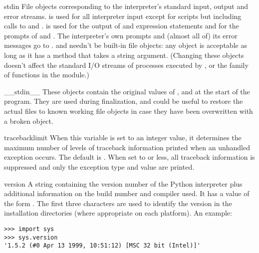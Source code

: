 \begin{datadesc}{stdin}
  File objects corresponding to the interpreter's standard input,
  output and error streams.   is used for all interpreter
  input except for scripts but including calls to
   and
  .   is
  used for the output of  and expression statements and
  for the prompts of  and .
  The interpreter's own prompts and (almost all of) its error messages
  go to .   and  needn't be
  built-in file objects: any object is acceptable as long as it has a
   method that takes a string argument.  (Changing
  these objects doesn't affect the standard I/O streams of processes
  executed by ,  or the
   family of functions in the 
  module.)
\end{datadesc}

\begin{datadesc}{__stdin__}
  These objects contain the original values of ,
   and  at the start of the program.  They
  are used during finalization, and could be useful to restore the
  actual files to known working file objects in case they have been
  overwritten with a broken object.
\end{datadesc}

\begin{datadesc}{tracebacklimit}
  When this variable is set to an integer value, it determines the
  maximum number of levels of traceback information printed when an
  unhandled exception occurs.  The default is .  When set
  to  or less, all traceback information is suppressed and
  only the exception type and value are printed.
\end{datadesc}

\begin{datadesc}{version}
  A string containing the version number of the Python interpreter
  plus additional information on the build number and compiler used.
  It has a value of the form .  The first three characters are used to identify
  the version in the installation directories (where appropriate on
  each platform).  An example:

\begin{verbatim}
>>> import sys
>>> sys.version
'1.5.2 (#0 Apr 13 1999, 10:51:12) [MSC 32 bit (Intel)]'
\end{verbatim}
\end{datadesc}

